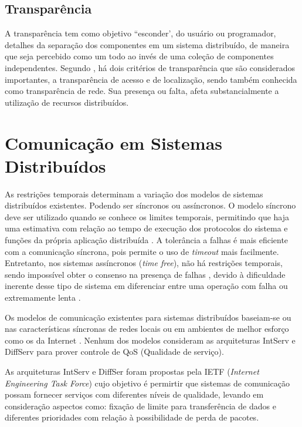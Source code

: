 \documentclass[
	12pt,				%
	oneside,			%
	a4paper,			%
	english,			%
	brazil				%
	]{abntex2ppgsi}
\begin{document}
\subsection{Transparência}

A transparência tem como objetivo ``esconder', do usuário ou programador, detalhes da separação dos componentes em um sistema distribuído, de maneira que seja percebido como um todo ao invés de uma coleção de componentes independentes. Segundo \cite{coulouris2013sistemas}, há dois critérios de transparência que são considerados importantes, a transparência de acesso e de localização, sendo também conhecida como transparência de rede. Sua presença ou falta, afeta substancialmente a utilização de recursos distribuídos.


\section{Comunicação em Sistemas Distribuídos}

As restrições temporais determinam a variação dos modelos de sistemas distribuídos existentes. Podendo ser síncronos ou assíncronos. O modelo síncrono deve ser utilizado quando se conhece os limites temporais, permitindo que haja uma estimativa com relação ao tempo de execução dos protocolos do sistema e funções  da própria aplicação distribuída \cite{lamport1982byzantine} \cite{lynch1996distributed} \cite{cristian1991reaching}. A tolerância a falhas é mais eficiente com a comunicação síncrona, pois permite o uso de \textit{timeout} mais facilmente. Entretanto, nos sistemas assíncronos (\textit{time free}), não há restrições temporais, sendo impossível obter o consenso  na presença de falhas \cite{fischer1985impossibility} \cite{de2000failure}, devido à dificuldade inerente desse tipo de sistema em diferenciar entre uma operação com falha ou extremamente lenta \cite{gorender2002modelo}.

Os modelos de comunicação existentes para sistemas distribuídos baseiam-se ou nas características síncronas de redes locais ou em ambientes de melhor esforço como os da Internet \cite{gorender2002modelo}. Nenhum dos modelos consideram as arquiteturas IntServ e DiffServ para prover controle de QoS (Qualidade de serviço).

As arquiteturas IntServ e DiffSer foram propostas pela IETF (\textit{Internet Engineering Task Force}) cujo objetivo  é permirtir que sistemas de comunicação possam fornecer serviços com diferentes níveis de qualidade, levando em consideração aspectos como: fixação de limite para transferência de dados e diferentes prioridades com relação à possibilidade de perda de pacotes.
\end{document}
